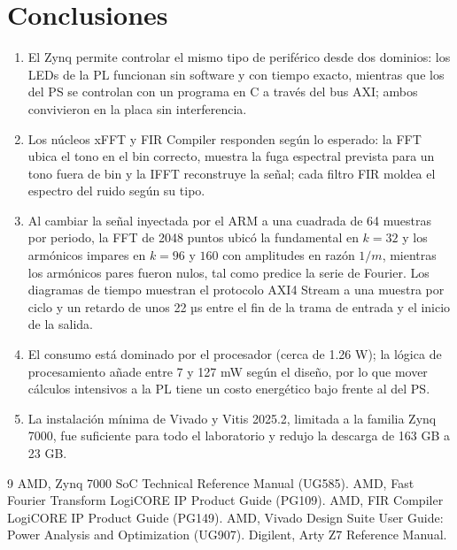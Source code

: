 \documentclass[11pt,a4paper]{article}
\begin{document}
\section{Conclusiones}
\begin{enumerate}
  \item El Zynq permite controlar el mismo tipo de periférico desde dos dominios: los LEDs de la PL funcionan sin software y con tiempo exacto, mientras que los del PS se controlan con un programa en C a través del bus AXI; ambos convivieron en la placa sin interferencia.
  \item Los núcleos xFFT y FIR Compiler responden según lo esperado: la FFT ubica el tono en el bin correcto, muestra la fuga espectral prevista para un tono fuera de bin y la IFFT reconstruye la señal; cada filtro FIR moldea el espectro del ruido según su tipo.
  \item Al cambiar la señal inyectada por el ARM a una cuadrada de 64 muestras por periodo, la FFT de 2048 puntos ubicó la fundamental en $k = 32$ y los armónicos impares en $k = 96$ y $160$ con amplitudes en razón $1/m$, mientras los armónicos pares fueron nulos, tal como predice la serie de Fourier. Los diagramas de tiempo muestran el protocolo AXI4 Stream a una muestra por ciclo y un retardo de unos 22 µs entre el fin de la trama de entrada y el inicio de la salida.
  \item El consumo está dominado por el procesador (cerca de 1.26 W); la lógica de procesamiento añade entre 7 y 127 mW según el diseño, por lo que mover cálculos intensivos a la PL tiene un costo energético bajo frente al del PS.
  \item La instalación mínima de Vivado y Vitis 2025.2, limitada a la familia Zynq 7000, fue suficiente para todo el laboratorio y redujo la descarga de 163 GB a 23 GB.
\end{enumerate}

\begin{thebibliography}{9}
 AMD, Zynq 7000 SoC Technical Reference Manual (UG585).
 AMD, Fast Fourier Transform LogiCORE IP Product Guide (PG109).
 AMD, FIR Compiler LogiCORE IP Product Guide (PG149).
 AMD, Vivado Design Suite User Guide: Power Analysis and Optimization (UG907).
 Digilent, Arty Z7 Reference Manual.
\end{thebibliography}
\end{document}
